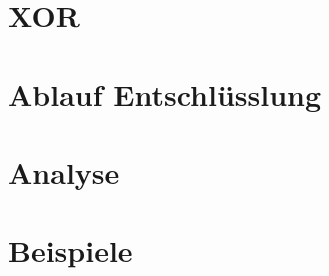 \documentclass[10pt,a4paper]{article}
\begin{document}
\section{XOR}
\section{Ablauf Entschlüsslung}
\section{Analyse}
\section{Beispiele}
\end{document}
